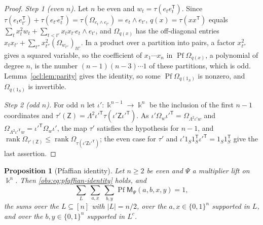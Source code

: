 \documentclass[11pt]{amsart}
\newtheorem{proposition}[theorem]{Proposition}
\theoremstyle{definition}
\theoremstyle{remark}
\numberwithin{equation}{section}
\newcommand{\abs}[1]{\lvert #1\rvert}
\newcommand{\rank}{\operatorname{rank}}
\theoremstyle{plain}
\theoremstyle{definition}
\theoremstyle{plain}
\begin{document}
\begin{proof}
\emph{Step 1 (even $n$).} Let $n$ be even and $w_t=\tau(e_te_t^{\mathsf T})$. Since $\tau(e_te_{t'}^{\mathsf
T})+\tau(e_{t'}e_t^{\mathsf T})=\tau(\Omega_{e_t\wedge e_{t'}})=e_t\wedge e_{t'}$, $q(x)=\tau(xx^{\mathsf T})$ equals
$\sum_tx_t^2w_t+\sum_{t<t'}x_tx_{t'}e_t\wedge e_{t'}$, and $\Omega_{q(x)}$ has the off-diagonal entries
$x_tx_{t'}+\sum_{t''}x_{t''}^2(\Omega_{w_{t''}})_{tt'}$. In a product over a partition into pairs, a factor $x_{t''}^2$
gives a squared variable, so the coefficient of $x_1\cdots x_n$ in $\operatorname{Pf}\Omega_{q(x)}$, a polynomial of
degree $n$, is the number $(n-1)(n-3)\cdots1$ of these partitions, which is odd. Lemma~\ref{ocl:lem:parity} gives the
identity, so some $\operatorname{Pf}\Omega_{q(1_S)}$ is nonzero, and $\Omega_{q(1_S)}$ is invertible.

\emph{Step 2 (odd $n$).} For odd $n$ let $\iota'\colon\Bbbk^{n-1}\to\Bbbk^n$ be the inclusion of the first $n-1$
coordinates and $\tau'(\mathsf Z)=\Lambda^2\iota'^{\mathsf T}\tau(\iota'\mathsf Z\iota'^{\mathsf T})$. As
$\iota'\Omega_w\iota'^{\mathsf T}=\Omega_{\Lambda^2\iota'w}$ and $\Omega_{\Lambda^2\iota'^{\mathsf T}w}=\iota'^{\mathsf
T}\Omega_w\iota'$, the map $\tau'$ satisfies the hypothesis for $n-1$, and $\rank\Omega_{\tau'(\mathsf
Z)}\le\rank\Omega_{\tau(\iota'\mathsf Z\iota'^{\mathsf T})}$; the even case for $\tau'$ and $\iota'1_S1_S^{\mathsf
T}\iota'^{\mathsf T}=1_S1_S^{\mathsf T}$ give the last assertion.
\end{proof}

\begin{proposition}[Pfaffian identity]\label{ocl:prop:pfaffian-identity}
Let $n\ge2$ be even and $\Psi$ a multiplier lift on $\Bbbk^n$. Then \eqref{obs:eq:pfaffian-identity} holds, and
\begin{equation}\label{ocl:eq:pfaffian-sum}
\sum_{L}\ \sum_{a,x}\ \sum_{b,y}\operatorname{Pf}\mathsf M_\Psi(a,b,x,y)=1,
\end{equation}
the sums over the $L\subseteq[n]$ with $\abs L=n/2$, over the $a,x\in\{0,1\}^n$ supported in $L$, and over the
$b,y\in\{0,1\}^n$ supported in $L^c$.
\end{proposition}
\end{document}
